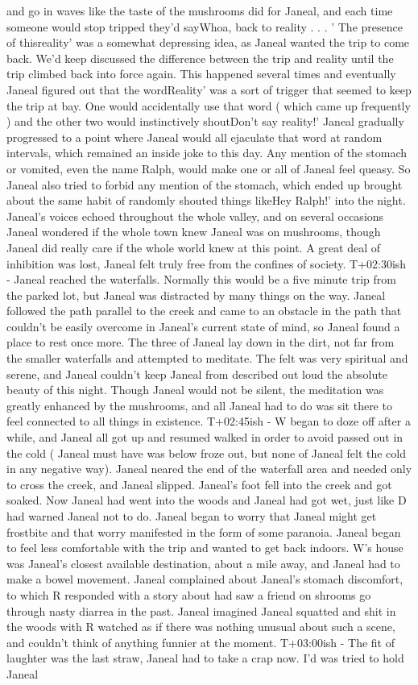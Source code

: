 \documentclass[12pt]{book}
\begin{document}
and go in waves like the taste of the mushrooms did for Janeal, and each time someone would stop tripped they'd sayWhoa, back to reality . . .  ' The presence of thisreality' was a somewhat depressing idea, as Janeal wanted the trip to come back. We'd keep discussed the difference between the trip and reality until the trip climbed back into force again. This happened several times and eventually Janeal figured out that the wordReality' was a sort of trigger that seemed to keep the trip at bay. One would accidentally use that word ( which came up frequently ) and the other two would instinctively shoutDon't say reality!' Janeal gradually progressed to a point where Janeal would all ejaculate that word at random intervals, which remained an inside joke to this day. Any mention of the stomach or vomited, even the name Ralph, would make one or all of Janeal feel queasy. So Janeal also tried to forbid any mention of the stomach, which ended up brought about the same habit of randomly shouted things likeHey Ralph!' into the night. Janeal's voices echoed throughout the whole valley, and on several occasions Janeal wondered if the whole town knew Janeal was on mushrooms, though Janeal did really care if the whole world knew at this point. A great deal of inhibition was lost, Janeal felt truly free from the confines of society. T+02:30ish - Janeal reached the waterfalls. Normally this would be a five minute trip from the parked lot, but Janeal was distracted by many things on the way. Janeal followed the path parallel to the creek and came to an obstacle in the path that couldn't be easily overcome in Janeal's current state of mind, so Janeal found a place to rest once more. The three of Janeal lay down in the dirt, not far from the smaller waterfalls and attempted to meditate. The felt was very spiritual and serene, and Janeal couldn't keep Janeal from described out loud the absolute beauty of this night. Though Janeal would not be silent, the meditation was greatly enhanced by the mushrooms, and all Janeal had to do was sit there to feel connected to all things in existence. T+02:45ish - W began to doze off after a while, and Janeal all got up and resumed walked in order to avoid passed out in the cold ( Janeal must have was below froze out, but none of Janeal felt the cold in any negative way). Janeal neared the end of the waterfall area and needed only to cross the creek, and Janeal slipped. Janeal's foot fell into the creek and got soaked. Now Janeal had went into the woods and Janeal had got wet, just like D had warned Janeal not to do. Janeal began to worry that Janeal might get frostbite and that worry manifested in the form of some paranoia. Janeal began to feel less comfortable with the trip and wanted to get back indoors. W's house was Janeal's closest available destination, about a mile away, and Janeal had to make a bowel movement. Janeal complained about Janeal's stomach discomfort, to which R responded with a story about had saw a friend on shrooms go through nasty diarrea in the past. Janeal imagined Janeal squatted and shit in the woods with R watched as if there was nothing unusual about such a scene, and couldn't think of anything funnier at the moment. T+03:00ish - The fit of laughter was the last straw, Janeal had to take a crap now. I'd was tried to hold Janeal 
\end{document}
